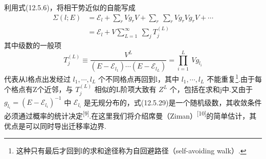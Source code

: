 利用式(12.5.6)，将相干势近似的自能写成
\begin{equation}
\begin{aligned}
  \Sigma\left(l;E\right)&=\mathscr{E}_{l}
  +\sum_{r}Vg_{r}V+\sum_{r}\ \sum_{r}Vg_{r}Vg_{r}V+\cdots\\
  &=\mathscr{E}_{l}+V\sum_{L=1}^{\infty}\ \sum_{j}T_{j}^{(L)}
\end{aligned}
\end{equation}
其中级数的一般项
\begin{equation}
  T_{j}^{(L)}\equiv\frac{V^{L}}{\left(E-\mathscr{E}_{l_{1}}\right)\cdots\left(E-\mathscr{E}_{l_{L}}\right)}
  =\prod_{i=1}^{L}\ Vg_{l_{i}}
\end{equation}
代表从l格点出发经过 $l_{1},\cdots,l_{L}$ 个不同格点再回到l，其中 $l_{1},\cdots,l_{L}$ 不能重复\footnote{这种只有最后才回到l的求和途径称为自回避路径（self-avoiding walk）.}.由于每个格点有Z个近邻，与 $T_{j}^{(L)}$ 相似的L阶项大致有 $Z^{L}$ 个，包括在求和j中.又由于 $g_{l_{i}}=\left(E-\mathscr{E}_{l_{i}}\right)^{-1}$ 中 $\mathscr{E}_{l_{i}}$ 是无规分布的，式(12.5.29)是一个随机级数，其收敛条件必须通过概率的统计决定\textsuperscript{[9]}.在这里我们将介绍席曼（Ziman）\textsuperscript{[10]}的简单估计，其优点是可以同时导出迁移率边界.

